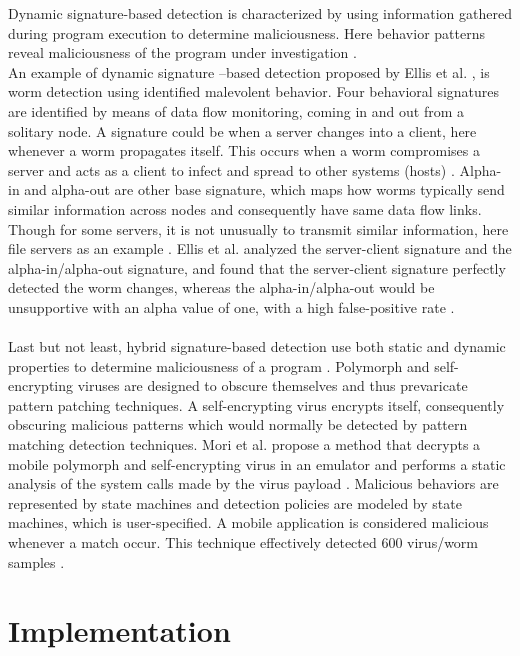 \documentclass[12pt]{article} %
\begin{document}
Dynamic signature-based detection is characterized by using information gathered during program execution to determine maliciousness. Here behavior patterns reveal maliciousness of the program under investigation \cite{idika2007survey}. \\
An example of dynamic signature –based detection proposed by Ellis et al. \cite{idika2007survey}, is worm detection using identified malevolent behavior. Four behavioral signatures are identified by means of data flow monitoring, coming in and out from a solitary node. A signature could be when a server changes into a client, here whenever a worm propagates itself. This occurs when a worm compromises a server and acts as a client to infect and spread to other systems (hosts) \cite{idika2007survey}. Alpha-in and alpha-out are other base signature, which maps how worms typically send similar information across nodes and consequently have same data flow links. Though for some servers, it is not unusually to transmit similar information, here file servers as an example \cite{idika2007survey}. Ellis et al. \cite{idika2007survey} analyzed the server-client signature and the alpha-in/alpha-out signature, and found that the server-client signature perfectly detected the worm changes, whereas the alpha-in/alpha-out would be unsupportive with an alpha value of one, with a high false-positive rate \cite{idika2007survey}. \\ \\
Last but not least, hybrid signature-based detection use both static and dynamic properties to determine maliciousness of a program \cite{idika2007survey}. Polymorph and self-encrypting viruses are designed to obscure themselves and thus prevaricate pattern patching techniques. A self-encrypting virus encrypts itself, consequently obscuring malicious patterns which would normally be detected by pattern matching detection techniques. Mori et al. \cite{idika2007survey} propose a method that decrypts a mobile polymorph and self-encrypting virus in an emulator and performs a static analysis of the system calls made by the virus payload \cite{idika2007survey}. Malicious behaviors are represented by state machines and detection policies are modeled by state machines, which is user-specified. A mobile application is considered malicious whenever a match occur. This technique effectively detected 600 virus/worm samples \cite{idika2007survey}.
\section{Implementation}
\end{document}
